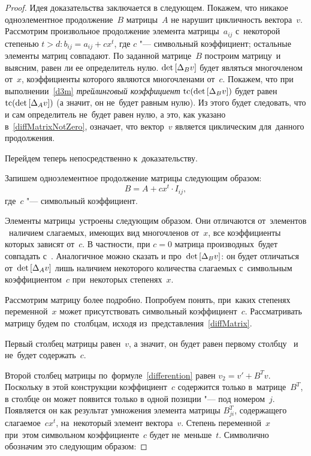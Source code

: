 \begin{proof}

Идея доказательства заключается в следующем.
Покажем, что никакое одноэлементное продолжение~$B$ матрицы~$A$ не нарушит цикличность вектора~$v$.
Рассмотрим произвольное продолжение элемента матрицы~$a_{ij}$ с~некоторой степенью $t > d: b_{ij} = a_{ij} + cx^t$,
где $c$ "--- символьный коэффициент; остальные элементы матриц совпадают.
По заданной матрице~$B$ построим матрицу~\diffMatrix[B] и выясним, равен ли ее определитель нулю.
$\mathop{\rm det} \text{$ [\Delta_B v] $}$ будет являться многочленом от~$x$, коэффициенты которого являются многочленами от~$c$.
Покажем, что при выполнении~\eqref{d3m} \textit{трейлинговый коэффициент} $\mathop{\rm tc} (\mathop{\rm det} \text{$ [\Delta_B v] $})$ будет равен $\mathop{\rm tc} (\mathop{\rm det} \text{$ [\Delta_A v] $})$
(а значит, он не~будет равным нулю).
Из этого будет следовать, что и сам определитель не~будет равен нулю, а это, как указано в~\eqref{diffMatrixNotZero}, означает, что вектор~$v$ является циклическим для~данного продолжения.
\medskip

Перейдем теперь непосредственно к~доказательству.

Запишем одноэлементное продолжение матрицы следующим образом:
\begin{equation}
	B = A + cx^t \cdot I_{ij},
\end{equation}
где~$c$ "--- символьный коэффициент.

Элементы матрицы~\diffMatrix[B] устроены следующим образом.
Они отличаются от~элементов \diffMatrix\ наличием слагаемых, имеющих вид многочленов от~$x$, все коэффициенты которых зависят от~$c$.
В частности, при $c = 0$ матрица производных~\diffMatrix[B] будет совпадать с~\diffMatrix.
Аналогичное можно сказать и про~$\mathop{\rm det} \text{$ [\Delta_B v] $}$: он будет отличаться от~$\mathop{\rm det} \text{$ [\Delta_A v] $}$ 
лишь наличием некоторого количества слагаемых с~символьным коэффициентом~$c$ при~некоторых степенях~$x$.
\medskip

Рассмотрим матрицу \diffMatrix[B] более подробно.
Попробуем понять, при~каких степенях переменной~$x$ может присутствовать символьный коэффициент~$c$.
Рассматривать матрицу будем по~столбцам, исходя из~представления~\eqref{diffMatrix}.

Первый столбец матрицы \diffMatrix[B] равен~$v$, а значит, он будет равен первому столбцу \diffMatrix\ и не~будет содержать~$c$.

Второй столбец матрицы \diffMatrix[B] по~формуле~\eqref{differention} равен $v_2 = v' + {B}^Tv$.
Поскольку в этой конструкции коэффициент~$c$ 
содержится только в~матрице~${B}^T$, в столбце он может появится только в одной позиции "--- под номером~$j$.
Появляется он как результат умножения элемента матрицы $B^{T}_{ji}$,
содержащего слагаемое~$cx^t$, на~некоторый элемент вектора~$v$.
Степень переменной~$x$ при~этом символьном коэффициенте~$c$
будет не~меньше~$t$. Символично обозначим это следующим образом:


\end{proof}
